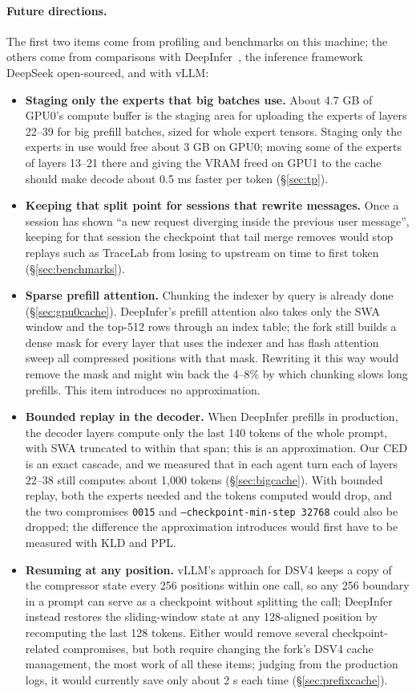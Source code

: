 \documentclass[11pt,a4paper]{article}
\newcommand{\code}[1]{\texttt{#1}}
\begin{document}
\paragraph{Future directions.} The first two items come from profiling and benchmarks on this machine; the others come from comparisons with DeepInfer~\cite{deepinfer}, the inference framework DeepSeek open-sourced, and with vLLM:
\begin{itemize}
  \item \textbf{Staging only the experts that big batches use.} About 4.7 GB of GPU0's compute buffer is the staging area for uploading the experts of layers 22--39 for big prefill batches, sized for whole expert tensors. Staging only the experts in use would free about 3 GB on GPU0; moving some of the experts of layers 13--21 there and giving the VRAM freed on GPU1 to the cache should make decode about 0.5 ms faster per token (\S\ref{sec:tp}).
  \item \textbf{Keeping that split point for sessions that rewrite messages.} Once a session has shown ``a new request diverging inside the previous user message'', keeping for that session the checkpoint that tail merge removes would stop replays such as TraceLab from losing to upstream on time to first token (\S\ref{sec:benchmarks}).
  \item \textbf{Sparse prefill attention.} Chunking the indexer by query is already done (\S\ref{sec:gpu0cache}). DeepInfer's prefill attention also takes only the SWA window and the top-512 rows through an index table; the fork still builds a dense mask for every layer that uses the indexer and has flash attention sweep all compressed positions with that mask. Rewriting it this way would remove the mask and might win back the 4--8\% by which chunking slows long prefills. This item introduces no approximation.
  \item \textbf{Bounded replay in the decoder.} When DeepInfer prefills in production, the decoder layers compute only the last 140 tokens of the whole prompt, with SWA truncated to within that span; this is an approximation. Our CED is an exact cascade, and we measured that in each agent turn each of layers 22--38 still computes about 1,000 tokens (\S\ref{sec:bigcache}). With bounded replay, both the experts needed and the tokens computed would drop, and the two compromises \code{0015} and \code{--checkpoint-min-step 32768} could also be dropped; the difference the approximation introduces would first have to be measured with KLD and PPL.
  \item \textbf{Resuming at any position.} vLLM's approach for DSV4 keeps a copy of the compressor state every 256 positions within one call, so any 256 boundary in a prompt can serve as a checkpoint without splitting the call; DeepInfer instead restores the sliding-window state at any 128-aligned position by recomputing the last 128 tokens. Either would remove several checkpoint-related compromises, but both require changing the fork's DSV4 cache management, the most work of all these items; judging from the production logs, it would currently save only about 2 s each time (\S\ref{sec:prefixcache}).

\end{itemize}
\end{document}
